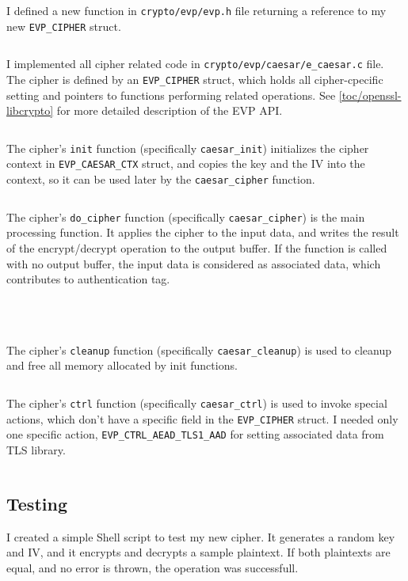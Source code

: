 I defined a new function in \texttt{crypto/evp/evp.h} file returning a reference to my new \texttt{EVP\_CIPHER} struct.

\inputminted{c}{code/openssl-evp-caesar.c}

I implemented all cipher related code in \texttt{crypto/evp/caesar/e\_caesar.c} file. The cipher is defined by an \texttt{EVP\_CIPHER} struct, which holds all cipher-cpecific setting and pointers to functions performing related operations. See \autoref{toc/openssl-libcrypto} for more detailed description of the EVP API.

\inputminted{c}{code/caesar_header.c}

The cipher's \texttt{init} function (specifically \texttt{caesar\_init}) initializes the cipher context in \texttt{EVP\_CAESAR\_CTX} struct, and copies the key and the IV into the context, so it can be used later by the \texttt{caesar\_cipher} function.

\inputminted{c}{code/caesar_init.c}

The cipher's \texttt{do\_cipher} function (specifically \texttt{caesar\_cipher}) is the main processing function. It applies the cipher to the input data, and writes the result of the encrypt/decrypt operation to the output buffer. If the function is called with no output buffer, the input data is considered as associated data, which contributes to authentication tag.

\inputminted{c}{code/caesar_cipher.c}
\inputminted{c}{code/caesar_set_ad.c}
\inputminted{c}{code/caesar_encrypt.c}
\inputminted{c}{code/caesar_decrypt.c}

The cipher's \texttt{cleanup} function (specifically \texttt{caesar\_cleanup}) is used to cleanup and free all memory allocated by init functions.

\inputminted{c}{code/caesar_cleanup.c}

The cipher's \texttt{ctrl} function (specifically \texttt{caesar\_ctrl}) is used to invoke special actions, which don't have a specific field in the \texttt{EVP\_CIPHER} struct. I needed only one specific action, \texttt{EVP\_CTRL\_AEAD\_TLS1\_AAD} for setting associated data from TLS library.

\inputminted{c}{code/caesar_ctrl.c}

\subsection{Testing}

I created a simple Shell script to test my new cipher. It generates a random key and IV, and it encrypts and decrypts a sample plaintext. If both plaintexts are equal, and no error is thrown, the operation was successfull.


